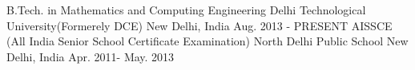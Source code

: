 \begin{cventries}
  \cventry
    {B.Tech. in Mathematics and Computing Engineering}
    {Delhi Technological University(Formerely DCE)}
    {New Delhi, India}
    {Aug. 2013 - PRESENT}
    {
    }
  \cventry
    {AISSCE (All India Senior School Certificate Examination)}
    {North Delhi Public School}
    {New Delhi, India}
    {Apr. 2011- May. 2013}
    {
    }
\end{cventries}
